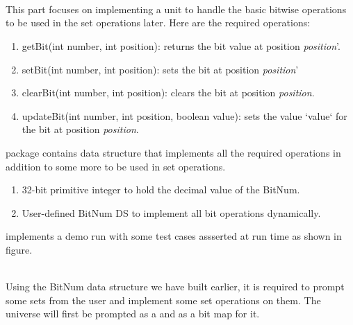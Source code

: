 \documentclass[11pt]{article}
\begin{document}

\vfill

\hfill 
{}
~\\~\\~\\
\hfill 
{}


\vfill

\newpage
{}
This part focuses on implementing a unit to handle the basic bitwise operations to be used in the set operations later. Here are the required operations: \\
\begin{enumerate}
  \item getBit(int number, int position): returns the bit value at position \textit{position}'.
  \item setBit(int number, int position): sets the bit at position \textit{position}'
  \item clearBit(int number, int position): clears the bit at position \textit{position}.
  \item updateBit(int number, int position, boolean value): sets the value `value` for the bit at position \textit{position}.
\end{enumerate}

 package contains  data structure that implements all the required operations in addition to some more to be used in set operations.\\

\begin{enumerate}
  \item 32-bit primitive integer to hold the decimal value of the BitNum.
  \item User-defined BitNum DS to implement all bit operations dynamically.
\end{enumerate}

\newpage

 implements a demo run with some test cases assserted at run time as shown in figure.\\~\\

\newpage


Using the BitNum data structure we have built earlier, it is required to prompt some sets from the user and implement some set operations on them. The universe will first be prompted as a  and  as a bit map for it. \\
\end{document}
